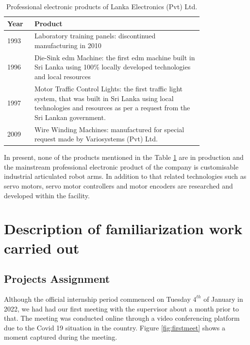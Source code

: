 \documentclass[a4paper,12pt]{report}%
\begin{document}
\begin{table}[H]
	\captionsetup{font=sc, labelsep=newline}
	\centering
	\caption{Professional electronic products of Lanka Electronics (Pvt) Ltd.}
	\begin{tabular}{|p{0.1\linewidth}  |p{0.7\linewidth}  |}
		\hline
		\textbf{Year} & \textbf{Product}\\\hline
		1993 & Laboratory training panels: discontinued manufacturing in 2010\\\hline
		1996 & Die-Sink \ac{edm} Machine: the first \ac{edm} machine built in Sri Lanka using 100\% locally developed technologies and local resources\\\hline
		1997& Motor Traffic Control Lights: the first traffic light system, that was built in Sri Lanka using local technologies and resources as per a request from the Sri Lankan government.\\\hline
		2009& Wire Winding Machines: manufactured for special request made by Variosystems (Pvt) Ltd.\\
		
		\hline
	\end{tabular}
	\label{table:pastproducts}
\end{table}

In present, none of the products mentioned in the Table \ref{table:pastproducts} are in production and the mainstream professional electronic product of the company is customisable industrial articulated robot arms. In addition to that related technologies such as servo motors, servo motor controllers and motor encoders  are researched and developed within the facility.

\chapter{Description of familiarization work carried out}
\section{Projects Assignment}

Although the official internship period commenced on Tuesday $4^{th}$ of January in 2022, we had had our first meeting with the supervisor about a month prior to that. The meeting was conducted online through a video conferencing platform due to the Covid 19 situation in the country. Figure \ref{fig:firstmeet} shows a moment captured during the meeting.
\end{document}
